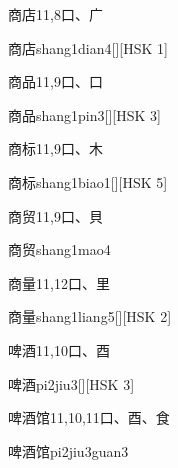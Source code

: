 \begin{entry}{商店}{11,8}{⼝、⼴}
  \begin{phonetics}{商店}{shang1dian4}[][HSK 1]
  \end{phonetics}
\end{entry}

\begin{entry}{商品}{11,9}{⼝、⼝}
  \begin{phonetics}{商品}{shang1pin3}[][HSK 3]
  \end{phonetics}
\end{entry}

\begin{entry}{商标}{11,9}{⼝、⽊}
  \begin{phonetics}{商标}{shang1biao1}[][HSK 5]
  \end{phonetics}
\end{entry}

\begin{entry}{商贸}{11,9}{⼝、⾙}
  \begin{phonetics}{商贸}{shang1mao4}
  \end{phonetics}
\end{entry}

\begin{entry}{商量}{11,12}{⼝、⾥}
  \begin{phonetics}{商量}{shang1liang5}[][HSK 2]
  \end{phonetics}
\end{entry}

\begin{entry}{啤酒}{11,10}{⼝、⾣}
  \begin{phonetics}{啤酒}{pi2jiu3}[][HSK 3]
  \end{phonetics}
\end{entry}

\begin{entry}{啤酒馆}{11,10,11}{⼝、⾣、⾷}
  \begin{phonetics}{啤酒馆}{pi2jiu3guan3}
  \end{phonetics}
\end{entry}

